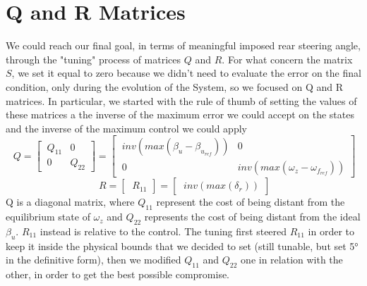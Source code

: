 \section{Q and R Matrices}
We could reach our final goal, in terms of meaningful imposed rear steering angle, through the "tuning" process of matrices $Q$ and $R$. For what concern the matrix $S$, we set it equal to zero because we didn't need to evaluate the error on the final condition, only during the evolution of the System, so we focused on Q and R matrices. In particular, we started with the rule of thumb of setting the values of these matrices a the inverse of the maximum error we could accept on the states and the inverse of the maximum control we could apply
\begin{equation} \label{Q MAtrix}
	\ Q =
	\begin{bmatrix}
	\ Q_{11} & 0\\
	\ 0 & Q_{22}
	\end{bmatrix} =
	\begin{bmatrix}
	\ inv(max(\beta_{u}-\beta_{u_{ref}})) & 0\\
	\ 0 & inv(max(\omega_{z}-\omega_{f_{ref}}))
	\end{bmatrix}
\end{equation}
\begin{equation} \label{R MAtrix}
	\ R =
	\begin{bmatrix}
	\ R_{11}
	\end{bmatrix} =
	\begin{bmatrix}
	\ inv(max(\delta_{r}))
	\end{bmatrix}
\end{equation}
Q is a diagonal matrix, where $ Q_{11} $ represent the cost of being distant from the equilibrium state of $ \omega_{z} $ and $ Q_{22} $ represents the cost of being distant from the ideal $ \beta_{u} $. $ R_{11} $ instead is relative to the control.
The tuning first steered $ R_{11} $ in order to keep it inside the physical bounds that we decided to set (still tunable, but set 5° in the definitive form), then we modified $ Q_{11} $ and $ Q_{22} $ one in relation with the other, in order to get the best possible compromise.
